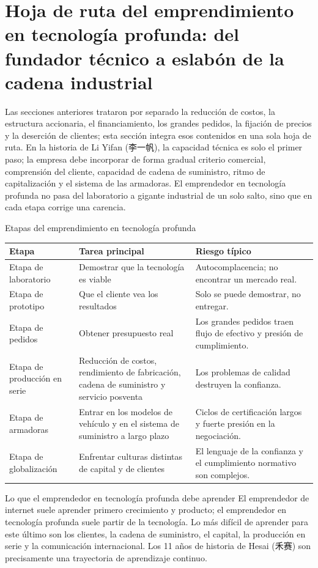 \section{Hoja de ruta del emprendimiento en tecnología profunda: del fundador técnico a eslabón de la cadena industrial}

Las secciones anteriores trataron por separado la reducción de costos, la estructura accionaria, el financiamiento, los grandes pedidos, la fijación de precios y la deserción de clientes; esta sección integra esos contenidos en una sola hoja de ruta. En la historia de Li Yifan (李一帆), la capacidad técnica es solo el primer paso; la empresa debe incorporar de forma gradual criterio comercial, comprensión del cliente, capacidad de cadena de suministro, ritmo de capitalización y el sistema de las armadoras. El emprendedor en tecnología profunda no pasa del laboratorio a gigante industrial de un solo salto, sino que en cada etapa corrige una carencia.

\begin{knowledgebox}{Etapas del emprendimiento en tecnología profunda}
\begin{tabularx}{\textwidth}{p{}p{}X}
\toprule
Etapa & Tarea principal & Riesgo típico \\
\midrule
Etapa de laboratorio & Demostrar que la tecnología es viable & Autocomplacencia; no encontrar un mercado real. \\
Etapa de prototipo & Que el cliente vea los resultados & Solo se puede demostrar, no entregar. \\
Etapa de pedidos & Obtener presupuesto real & Los grandes pedidos traen flujo de efectivo y presión de cumplimiento. \\
Etapa de producción en serie & Reducción de costos, rendimiento de fabricación, cadena de suministro y servicio posventa & Los problemas de calidad destruyen la confianza. \\
Etapa de armadoras & Entrar en los modelos de vehículo y en el sistema de suministro a largo plazo & Ciclos de certificación largos y fuerte presión en la negociación. \\
Etapa de globalización & Enfrentar culturas distintas de capital y de clientes & El lenguaje de la confianza y el cumplimiento normativo son complejos. \\
\bottomrule
\end{tabularx}
\end{knowledgebox}

\begin{importantbox}{Lo que el emprendedor en tecnología profunda debe aprender}
El emprendedor de internet suele aprender primero crecimiento y producto; el emprendedor en tecnología profunda suele partir de la tecnología. Lo más difícil de aprender para este último son los clientes, la cadena de suministro, el capital, la producción en serie y la comunicación internacional. Los 11 años de historia de Hesai (禾赛) son precisamente una trayectoria de aprendizaje continuo.
\end{importantbox}

